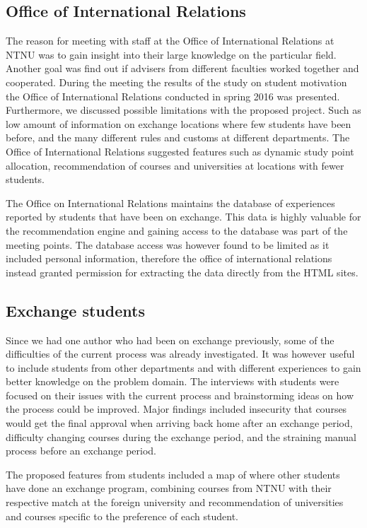 \subsection{Office of International Relations}
The reason for meeting with staff at the Office of International Relations at NTNU was to gain insight into their large knowledge on the particular field. Another goal was find out if advisers from different faculties worked together and cooperated. During the meeting the results of the study on student motivation the Office of International Relations conducted in spring 2016 was presented. Furthermore, we discussed possible limitations with the proposed project. Such as low amount of information on exchange locations where few students have been before, and the many different rules and customs at different departments. The Office of International Relations suggested features such as dynamic study point allocation, recommendation of courses and universities at locations with fewer students.

The Office on International Relations maintains the database of experiences reported by students that have been on exchange. This data is highly valuable for the recommendation engine and gaining access to the database was part of the meeting points. The database access was however found to be limited as it included personal information, therefore the office of international relations instead granted permission for extracting the data directly from the HTML sites. 

\subsection{Exchange students}
Since we had one author who had been on exchange previously, some of the difficulties of the current process was already investigated. It was however useful to include students from other departments and with different experiences to gain better knowledge on the problem domain. The interviews with students were focused on their issues with the current process and brainstorming ideas on how the process could be improved. Major findings included insecurity that courses would get the final approval when arriving back home after an exchange period, difficulty changing courses during the exchange period, and the straining manual process before an exchange period.

The proposed features from students included a map of where other students have done an exchange program, combining courses from NTNU with their respective match at the foreign university and recommendation of universities and courses specific to the preference of each student. 


